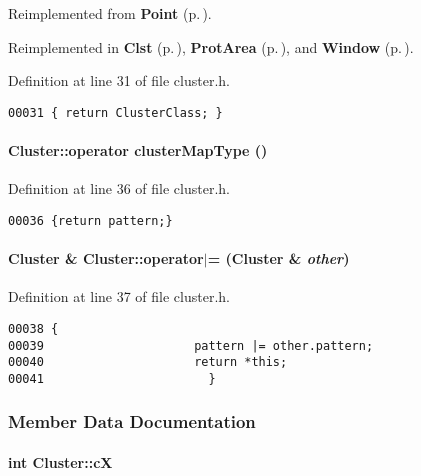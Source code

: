 Reimplemented from {\bf Point} {\rm (p.\,\pageref{Point_a4})}.

Reimplemented in {\bf Clst} {\rm (p.\,\pageref{Clst_a3})}, {\bf Prot\-Area} {\rm (p.\,\pageref{ProtArea_a2})}, and {\bf Window} {\rm (p.\,\pageref{Window_a2})}.

Definition at line 31 of file cluster.h.\small\begin{verbatim}00031 { return ClusterClass; }
\end{verbatim}\normalsize 
\label{Cluster_a6}
\paragraph{\setlength{\rightskip}{0pt plus 5cm}Cluster::operator {\bf cluster\-Map\-Type} ()\hspace{0.3cm}{\tt  [inline]}}\hfill



Definition at line 36 of file cluster.h.\small\begin{verbatim}00036 {return pattern;}
\end{verbatim}\normalsize 
\label{Cluster_a7}
\paragraph{\setlength{\rightskip}{0pt plus 5cm}Cluster \& Cluster::operator$|$= (Cluster \& {\em other})\hspace{0.3cm}{\tt  [inline]}}\hfill



Definition at line 37 of file cluster.h.\small\begin{verbatim}00038 {
00039                     pattern |= other.pattern;
00040                     return *this;
00041                       }
\end{verbatim}\normalsize 


\subsubsection{Member Data Documentation}
\label{Cluster_m0}
\paragraph{\setlength{\rightskip}{0pt plus 5cm}int Cluster::c\-X}\hfill



